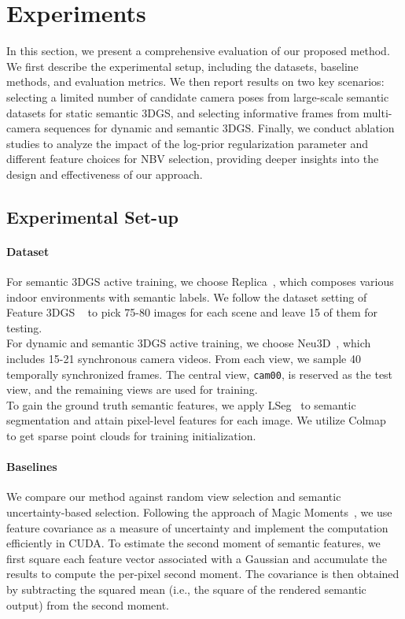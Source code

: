\section{Experiments}
In this section, we present a comprehensive evaluation of our proposed method. We first describe the experimental setup, including the datasets, baseline methods, and evaluation metrics. We then report results on two key scenarios: selecting a limited number of candidate camera poses from large-scale semantic datasets for static semantic 3DGS, and selecting informative frames from multi-camera sequences for dynamic and semantic 3DGS. Finally, we conduct ablation studies to analyze the impact of the log-prior regularization parameter and different feature choices for NBV selection, providing deeper insights into the design and effectiveness of our approach.

\subsection{Experimental Set-up}
\paragraph{Dataset}
For semantic 3DGS active training, we choose Replica~\cite{replica}, which composes various indoor environments with semantic labels. We follow the dataset setting of Feature 3DGS ~\cite{feature3dgs} to pick 75-80 images for each scene and leave 15 of them for testing. \\
For dynamic and semantic 3DGS active training, we choose Neu3D~\cite{dynerf}, which includes 15-21 synchronous camera videos. From each view, we sample 40 temporally synchronized frames. The central view, \texttt{cam00}, is reserved as the test view, and the remaining views are used for training. \\ 
To gain the ground truth semantic features, we apply LSeg~\cite{Lseg} to semantic segmentation and attain pixel-level features for each image. We utilize Colmap~\cite{schoenberger2016mvs}~\cite{schoenberger2016sfm} to get sparse point clouds for training initialization. 

\paragraph{Baselines}
We compare our method against random view selection and semantic uncertainty-based selection. Following the approach of Magic Moments~\cite{MagicMoments}, we use feature covariance as a measure of uncertainty and implement the computation efficiently in CUDA. To estimate the second moment of semantic features, we first square each feature vector associated with a Gaussian and accumulate the results to compute the per-pixel second moment. The covariance is then obtained by subtracting the squared mean (i.e., the square of the rendered semantic output) from the second moment.

